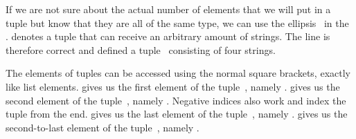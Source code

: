 %
\begin{sloppypar}%
If we are not sure about the actual number of elements that we will put in a tuple but know that they are all of the same type, we can use the ellipsis~ in the .
 denotes a tuple that can receive an arbitrary amount of strings.
The line  is therefore correct and defined a tuple~ consisting of four strings.%
\end{sloppypar}%
%
The elements of tuples can be accessed using the normal square brackets, exactly like list elements.
 gives us the first element of the tuple~, namely .
 gives us the second element of the tuple~, namely .
Negative indices also work and index the tuple from the end.
 gives us the last element of the tuple~, namely .
 gives us the second-to-last element of the tuple~, namely .

